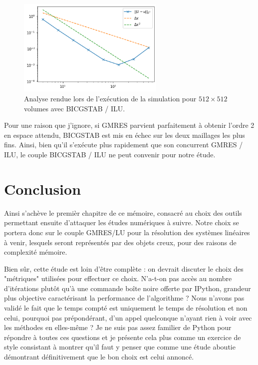 \begin{figure}[htp]
    \centering
    \includegraphics[width=7cm]{Images/preliminaires/Laplace Dirichlet 2D creux GMRES Precond/analyseILU.png}
    \caption{Analyse rendue lors de l'exécution de la simulation pour $512 \times 512$ volumes avec BICGSTAB / ILU.}
    \label{fig:creuxLaplacien2DBICGSTABPrecondILU}
\end{figure}

\newpage

Pour une raison que j'ignore, si GMRES parvient parfaitement à obtenir l'ordre 2 en espace attendu, BICGSTAB est mis en échec sur les deux maillages les plus fins. Ainsi, bien qu'il s'exécute plus rapidement que son concurrent GMRES / ILU, le couple BICGSTAB / ILU ne peut convenir pour notre étude.

\section{Conclusion}

Ainsi s'achève le premièr chapitre de ce mémoire, consacré au choix des outils permettant ensuite d'attaquer les études numériques à suivre. Notre choix se portera donc sur le couple GMRES/LU pour la résolution des systèmes linéaires à venir, lesquels seront représentés par des objets creux, pour des raisons de complexité mémoire.

Bien sûr, cette étude est loin d'être complète : on devrait discuter le choix des "métriques" utilisées pour effectuer ce choix. N'a-t-on pas accès au nombre d'itérations plutôt qu'à une commande boîte noire offerte par IPython, grandeur plus objective caractérisant la performance de l'algorithme ? Nous n'avons pas validé le fait que le temps compté est uniquement le temps de résolution et non celui, pourquoi pas prépondérant, d'un appel quelconque n'ayant rien à voir avec les méthodes en elles-même ? Je ne suis pas assez familier de Python pour répondre à toutes ces questions et je présente cela plus comme un exercice de style consistant à montrer qu'il faut y penser que comme une étude aboutie démontrant définitivement que le bon choix est celui annoncé.